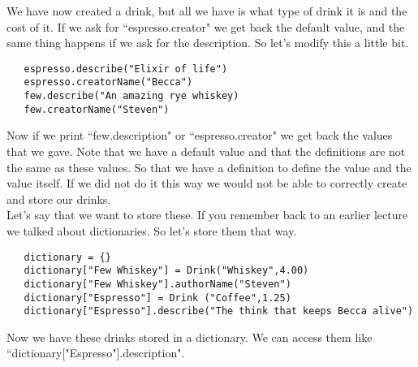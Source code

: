 \documentclass[11pt]{article}   %
\begin{document}
We have now created a drink, but all we have is what type of drink it is and the cost of it.  If we ask for ``espresso.creator" we get back the default value,
and the same thing happens if we ask for the description.  So let's modify this a little bit.
\begin{tcolorbox}
   \begin{lstlisting}
   espresso.describe("Elixir of life")
   espresso.creatorName("Becca")
   few.describe("An amazing rye whiskey)
   few.creatorName("Steven")
   \end{lstlisting}
\end{tcolorbox}
Now if we print ``few.description" or ``espresso.creator" we get back the values that we gave.  Note that we have a default value and that the 
definitions are not the same as these values.  So that we have a definition to define the value and the value itself.  If we did not do it this way we
would not be able to correctly create and store our drinks.
\\
Let's say that we want to store these.  If you remember back to an earlier lecture we talked about dictionaries.  So let's store them that way.
\begin{tcolorbox}
   \begin{lstlisting}
   dictionary = {}
   dictionary["Few Whiskey"] = Drink("Whiskey",4.00)
   dictionary["Few Whiskey"].authorName("Steven")
   dictionary["Espresso"] = Drink ("Coffee",1.25)
   dictionary["Espresso"].describe("The think that keeps Becca alive")
   \end{lstlisting}
\end{tcolorbox}
Now we have these drinks stored in a dictionary.  We can access them like ``dictionary["Espresso"].description".  
\end{document}
